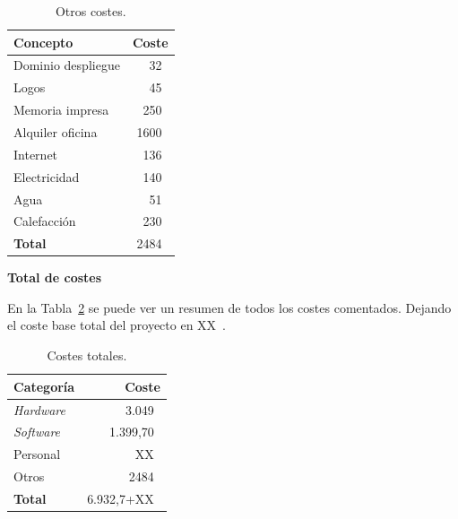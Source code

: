 \begin{table}[H]
\centering
\begin{tabular}{lr}
	\toprule
	\textbf{Concepto} & \textbf{Coste} \\
	\midrule
	Dominio despliegue & 32~\officialeuro \\
	Logos & 45~\officialeuro \\
	Memoria impresa & 250~\officialeuro \\
	Alquiler oficina & 1600~\officialeuro \\
	Internet & 136~\officialeuro \\
	Electricidad & 140~\officialeuro \\
	Agua & 51~\officialeuro \\
	Calefacción & 230~\officialeuro \\
	\midrule
	\textbf{Total} & 2484~\officialeuro \\
	\bottomrule
\end{tabular}
\caption{Otros costes.}\label{tab:costes-otros}
\end{table}

\textbf{Total de  costes}

En la Tabla~\ref{tab:costes-totales} se puede ver un resumen de todos los costes comentados. Dejando el coste base total del proyecto en XX~\officialeuro.

\begin{table}[H]
\centering
\begin{tabular}{lr}
	\toprule
	\textbf{Categoría} & \textbf{Coste} \\
	\midrule
	\textit{Hardware} & 3.049~\officialeuro \\
	\textit{Software} & 1.399,70~\officialeuro \\
	Personal & XX~\officialeuro \\
	Otros & 2484~\officialeuro \\
	\midrule
	\textbf{Total} & 6.932,7+XX~\officialeuro \\
	\bottomrule
\end{tabular}
\caption{Costes totales.}\label{tab:costes-totales}
\end{table}



